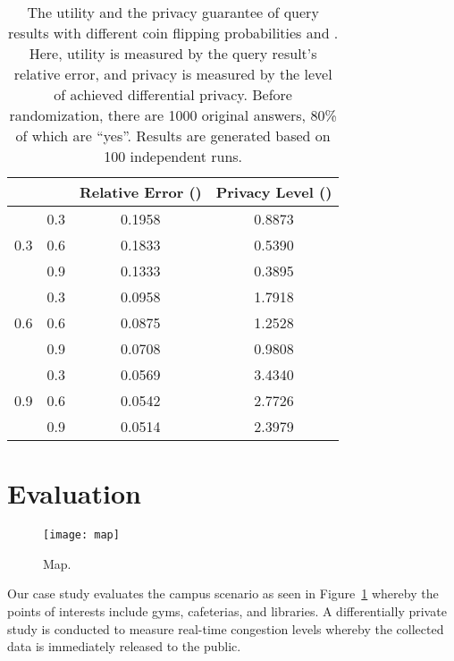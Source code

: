 \documentclass[conference]{IEEEtran}
\begin{document}
\begin{table}[t!]
\small
\centering
\begin{tabular}{c|c|c|c}
\hline  &  & Relative Error () & Privacy Level () \\
\hline
\hline \multirow{3}{*}{0.3} & 0.3 & 0.1958 & 0.8873\\
  & 0.6 & 0.1833 & 0.5390\\
  & 0.9 & 0.1333 & 0.3895\\
\hline \multirow{3}{*}{0.6} & 0.3 & 0.0958 & 1.7918\\
  & 0.6 & 0.0875 & 1.2528\\
  & 0.9 & 0.0708 & 0.9808\\
\hline \multirow{3}{*}{0.9} & 0.3 & 0.0569 & 3.4340 \\
  & 0.6 & 0.0542 & 2.7726\\
  & 0.9 & 0.0514 & 2.3979\\
\hline
\end{tabular}
\vspace{-2mm}
\caption{The utility and the privacy guarantee of query results with different coin flipping probabilities  and .  Here, utility is measured by the query result's relative error, and privacy is measured by the level of achieved differential privacy.  Before randomization, there are 1000 original answers, 80\% of which are ``yes''.  Results are generated based on 100 independent runs.}
\vspace{-2.5mm}
\label{tab:utility-privacy}
\end{table}
 \section{Evaluation}

\begin{figure}[t!]
\centering
\texttt{[image: map]}
\caption{Map.}
\label{fig:map}
\end{figure}

Our case study evaluates the campus scenario as seen in Figure~\ref{fig:map} whereby the points of interests include gyms, cafeterias, and libraries.  A differentially private study is conducted to measure real-time congestion levels whereby the collected data is immediately released to the public.
\end{document}
